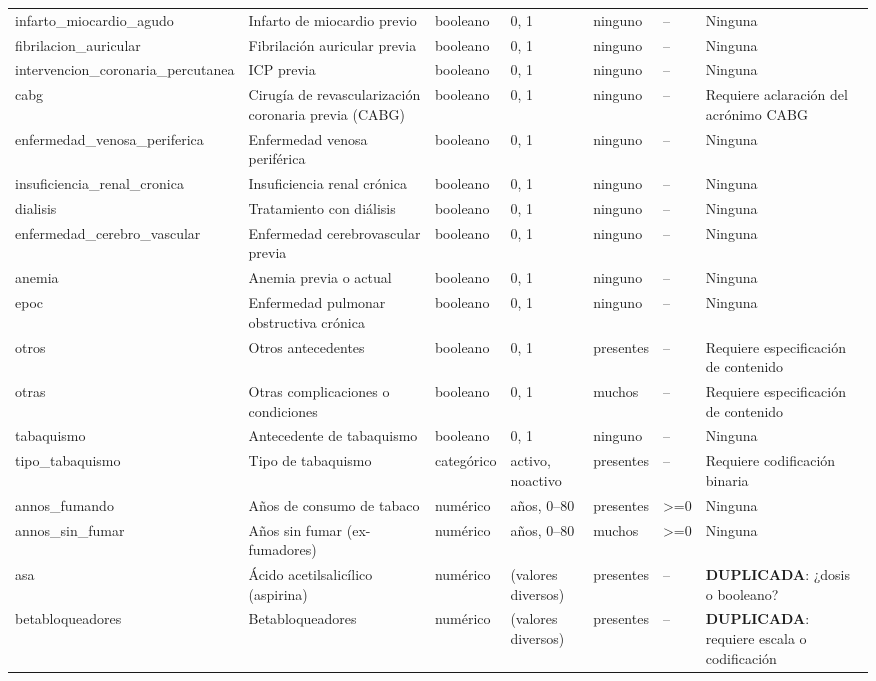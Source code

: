 \documentclass[11pt,a4paper]{article}
\begin{document}
\begin{longtable}{@{}L{0.095\textwidth} L{0.17\textwidth} L{0.07\textwidth} L{0.16\textwidth} L{0.14\textwidth} L{0.13\textwidth} L{0.15\textwidth}@{}}
infarto\_miocardio\_agudo & Infarto de miocardio previo & booleano & 0, 1 & ninguno & -- & Ninguna \\
fibrilacion\_auricular & Fibrilación auricular previa & booleano & 0, 1 & ninguno & -- & Ninguna \\
intervencion\_coronaria\_percutanea & ICP previa & booleano & 0, 1 & ninguno & -- & Ninguna \\
cabg & Cirugía de revascularización coronaria previa (CABG) & booleano & 0, 1 & ninguno & -- & Requiere aclaración del acrónimo CABG \\
enfermedad\_venosa\_periferica & Enfermedad venosa periférica & booleano & 0, 1 & ninguno & -- & Ninguna \\
insuficiencia\_renal\_cronica & Insuficiencia renal crónica & booleano & 0, 1 & ninguno & -- & Ninguna \\
dialisis & Tratamiento con diálisis & booleano & 0, 1 & ninguno & -- & Ninguna \\
enfermedad\_cerebro\_vascular & Enfermedad cerebrovascular previa & booleano & 0, 1 & ninguno & -- & Ninguna \\
anemia & Anemia previa o actual & booleano & 0, 1 & ninguno & -- & Ninguna \\
epoc & Enfermedad pulmonar obstructiva crónica & booleano & 0, 1 & ninguno & -- & Ninguna \\
otros & Otros antecedentes & booleano & 0, 1 & presentes & -- & Requiere especificación de contenido \\
otras & Otras complicaciones o condiciones & booleano & 0, 1 & muchos & -- & Requiere especificación de contenido \\
tabaquismo & Antecedente de tabaquismo & booleano & 0, 1 & ninguno & -- & Ninguna \\
tipo\_tabaquismo & Tipo de tabaquismo & categórico & activo, noactivo & presentes & -- & Requiere codificación binaria \\
annos\_fumando & Años de consumo de tabaco & numérico & años, 0--80 & presentes & >=0 & Ninguna \\
annos\_sin\_fumar & Años sin fumar (ex-fumadores) & numérico & años, 0--80 & muchos & >=0 & Ninguna \\
asa & Ácido acetilsalicílico (aspirina) & numérico & (valores diversos) & presentes & -- & \textbf{DUPLICADA}: ¿dosis o booleano? \\
betabloqueadores & Betabloqueadores & numérico & (valores diversos) & presentes & -- & \textbf{DUPLICADA}: requiere escala o codificación \\

\end{longtable}
\end{document}
